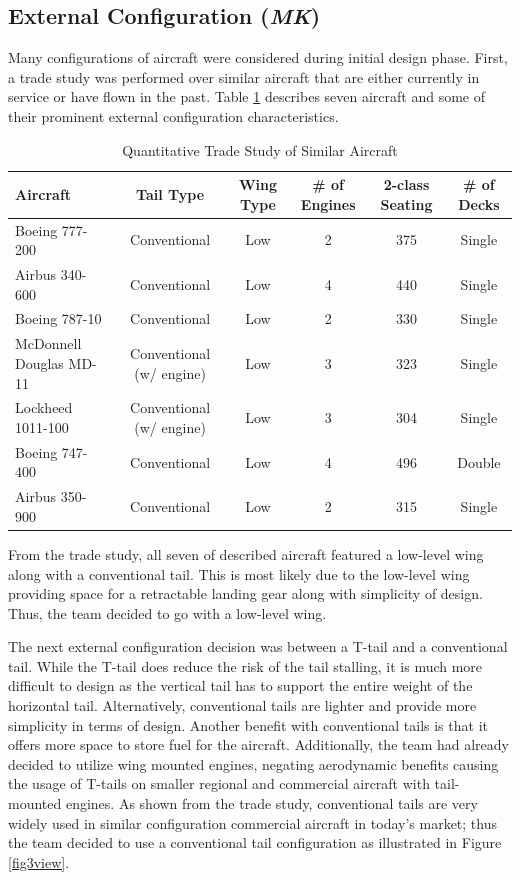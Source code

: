 \subsection{External Configuration  (\textit{MK})}
Many configurations of aircraft were considered during initial design phase. First, a trade study was performed over similar aircraft that are either currently in service or have flown in the past. Table \ref{tabmk1} describes seven aircraft and some of their prominent external configuration characteristics. 

\begin{table}[H]
    \centering
    \caption{Quantitative Trade Study of Similar Aircraft}
    \begin{tabular}{|m{3cm}||c|c|c|c|c|}
    \toprule
    \label{tabmk1}
    \textbf{Aircraft} & \textbf{Tail Type} & \textbf{Wing Type} & \textbf{\# of Engines} & \textbf{2-class Seating} & \textbf{\# of Decks} \\
    \hline\hline
    Boeing 777-200 & Conventional & Low & 2 & 375 & Single \\
    \hline
    Airbus 340-600 & Conventional & Low & 4 & 440 & Single \\
    \hline
    Boeing 787-10 & Conventional & Low & 2 & 330 & Single \\
    \hline
    McDonnell Douglas MD-11 & Conventional (w/ engine) & Low & 3 & 323 & Single \\
    \hline
    Lockheed 1011-100 & Conventional (w/ engine) & Low & 3 & 304 & Single \\
    \hline
    Boeing 747-400 & Conventional & Low & 4 & 496 & Double \\
    \hline
    Airbus 350-900 & Conventional & Low & 2 & 315 & Single \\
    \bottomrule
    \end{tabular}
\end{table}
\clearpage
From the trade study, all seven of described aircraft featured a low-level wing along with a conventional tail. This is most likely due to the low-level wing providing space for a retractable landing gear along with simplicity of design. Thus, the team decided to go with a low-level wing.

The next external configuration decision was between a T-tail and a conventional tail. While the T-tail does reduce the risk of the tail stalling, it is much more difficult to design as the vertical tail has to support the entire weight of the horizontal tail. Alternatively, conventional tails are lighter and provide more simplicity in terms of design. Another benefit with conventional tails is that it offers more space to store fuel for the aircraft. Additionally, the team had already decided to utilize wing mounted engines, negating aerodynamic benefits causing the usage of T-tails on smaller regional and commercial aircraft with tail-mounted engines.  As shown from the trade study, conventional tails are very widely used in similar configuration commercial aircraft in today's market; thus the team decided to use a conventional tail configuration as illustrated in Figure \ref{fig3view}. 

